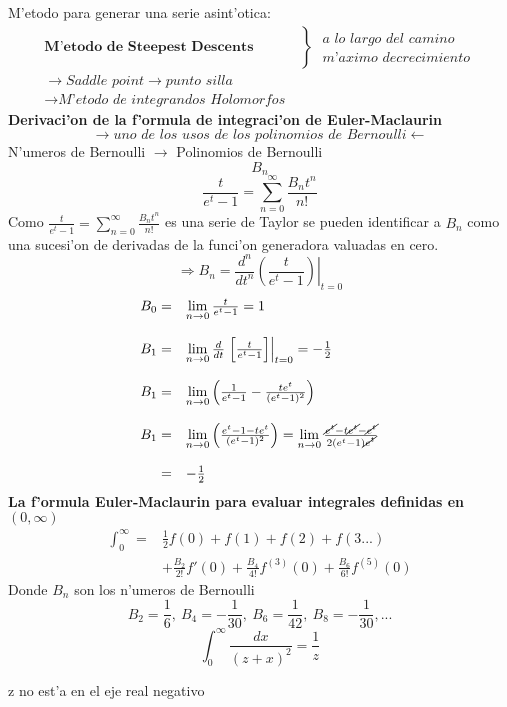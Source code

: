 \documentclass{article}
\theoremstyle{definition}
\begin{document}
M'etodo para generar una serie asint'otica:
\[\begin{array}{ll}
	\textbf{M'etodo de Steepest Descents}
	&\left\}\begin{array}{ll}
		\textit{a lo largo del camino}\\
		\textit{m'aximo decrecimiento}	
	\end{array}\right.\\
	\to \textit{Saddle point}\to \textit{punto silla}\\
	\to \textit{M'etodo de integrandos Holomorfos}
\end{array}\]
\textbf{Derivaci'on de la f'ormula de integraci'on de Euler-Maclaurin}
\[\longrightarrow \textit{uno de los usos de los polinomios de Bernoulli}\longleftarrow\]
N'umeros de Bernoulli $\longrightarrow$ Polinomios de Bernoulli
\[B_n\]
\[\frac{t}{e^t-1}=\sum^{\infty}_{n=0}\frac{B_nt^n}{n!}\]
Como $\frac{t}{e^t-1}=\sum^{\infty}_{n=0}\frac{B_nt^n}{n!}$ es una serie de Taylor se pueden identificar a $B_n$ como una sucesi'on de derivadas de la funci'on generadora valuadas en cero.
\[\Rightarrow B_n=\frac{d^n}{dt^n}\left.\left(\frac{t}{e^t-1}\right)\right|_{t=0}\]
\[
\begin{array}{rl}
	B_0=&\lim\limits_{n\to 0}\frac{t}{e^t-1}=1\\
	\\
	B_1=&\lim\limits_{n\to 0}\frac{d}{dt}\left.\left[\frac{t}{e^t-1}\right]\right|_{t=0}=-\frac{1}{2}\\
	\\
	B_1=& \lim\limits_{n\to 0}\left(\frac{1}{e^t-1}-\frac{te^t}{(e^t-1)^2}\right)\\
	\\
	B_1=& \lim\limits_{n\to 0}\left(\frac{e^t-1-te^t}{(e^t-1)^2}\right)=\lim\limits_{n\to 0}\frac{\cancel{e^t}-t\cancel{e^t}-\cancel{e^t}}{2(e^t-1)\cancel{e^t}}\\
	\\
	=& -\frac{1}{2}
\end{array}\]
\textbf{La f'ormula Euler-Maclaurin para evaluar integrales definidas en $(0,\infty)$}
\[
\begin{array}{rl}
	\int^{\infty}_0=&\frac{1}{2}f(0)+f(1)+f(2)+f(3...)\\
	&+\frac{B_2}{2!}f'(0)+\frac{B_4}{4!}f^{(3)}(0)+\frac{B_6}{6!}f^{(5)}(0)
\end{array}\]
Donde $B_n$ son los n'umeros de Bernoulli
\[B_2=\frac{1}{6},\ B_4=-\frac{1}{30},\ B_6=\frac{1}{42},\ B_8=-\frac{1}{30},...\]
\[\int^{\infty}_0\frac{dx}{(z+x)^2}=\frac{1}{z}\]
\begin{center}
	z no est'a en el eje real negativo
\end{center}
\end{document}
